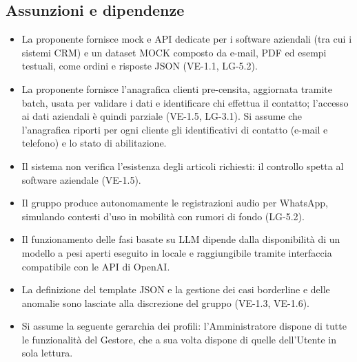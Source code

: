 \subsection{Assunzioni e dipendenze}
	\begin{itemize}
		\item La proponente fornisce mock e API dedicate per i software aziendali (tra cui i sistemi CRM) e un dataset MOCK composto da e-mail, PDF ed esempi testuali, come ordini e risposte JSON (VE-1.1, LG-5.2).
		\item La proponente fornisce l'anagrafica clienti pre-censita, aggiornata tramite batch, usata per validare i dati e identificare chi effettua il contatto; l'accesso ai dati aziendali è quindi parziale (VE-1.5, LG-3.1). Si assume che l'anagrafica riporti per ogni cliente gli identificativi di contatto (e-mail e telefono) e lo stato di abilitazione.
		\item Il sistema non verifica l'esistenza degli articoli richiesti: il controllo spetta al software aziendale (VE-1.5).
		\item Il gruppo produce autonomamente le registrazioni audio per WhatsApp, simulando contesti d'uso in mobilità con rumori di fondo (LG-5.2).
		\item Il funzionamento delle fasi basate su LLM dipende dalla disponibilità di un modello a pesi aperti eseguito in locale e raggiungibile tramite interfaccia compatibile con le API di OpenAI.
		\item La definizione del template JSON e la gestione dei casi borderline e delle anomalie sono lasciate alla discrezione del gruppo (VE-1.3, VE-1.6).
		\item Si assume la seguente gerarchia dei profili: l'Amministratore dispone di tutte le funzionalità del Gestore, che a sua volta dispone di quelle dell'Utente in sola lettura.
	\end{itemize}